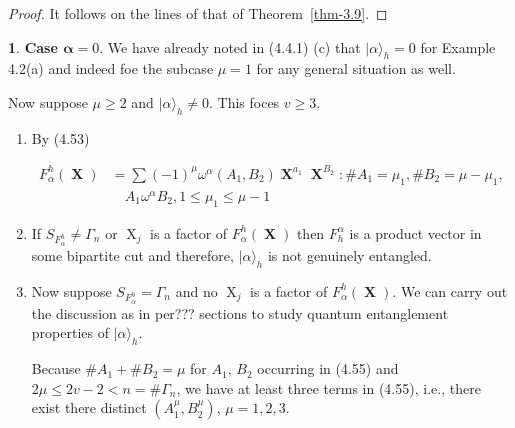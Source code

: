 \documentclass[a4paper,12pt]{article}
\DeclareMathOperator{\x}{\mathrm{X}}
\theoremstyle{definition}
\theoremstyle{underlinethm}
\theoremstyle{definition}
\newtheorem{subsubsec}{}[subsection]
\begin{document}
\begin{proof}
It follows on the lines of that of Theorem~\ref{thm-3.9}.
\end{proof}

\begin{subsubsec}\label{subsubsection-4.4.2}
\textbf{Case $\boldsymbol{\alpha} =0$}. We have already noted in (4.4.1) (c) that $| \alpha \rangle_{h} = 0$ for Example 4.2(a) and indeed foe the subcase $\mu=1$ for any general situation as well.

Now suppose $\mu \geq 2$ and $| \alpha \rangle_{h} \neq 0$. This foces $v \geq 3$.

\end{subsubsec}

\begin{enumerate}[label=(\alph*)]

\item By (4.53)

\begin{align*}
F_{\alpha}^{h}(\boldsymbol{\x}) &= \sum (-1)^{\mu} \omega^{\alpha}(A_{1}, B_{2}) \boldsymbol{\x}^{a_{1}} \boldsymbol{\x}^{B_{2}} : \# A_{1} = \mu_{1}, \# B_{2} = \mu-\mu_{1},\\
&\quad A_{1}\omega^{\alpha} B_{2}, 1 \leq \mu_{1} \leq \mu-1\tag{4.55}\label{eq-4.55} 
\end{align*}

\item If $S_{F^{h}_{\alpha}} \neq \Gamma_{n}$ or $\x_{j}$ is a factor of $F_{\alpha}^{h}(\boldsymbol{\x})$ then $F_{h}^{\alpha}$ is a product vector in some bipartite cut and therefore, $| \alpha \rangle_{h}$ is not genuinely entangled. 

\item Now suppose $S_{F_{\alpha}^{h}}= \Gamma_{n}$ and no $\x_{j}$ is a factor of $F_{\alpha}^{h}(\boldsymbol{\x})$. We can carry out the discussion as in per??? sections to study quantum entanglement properties of $| \alpha \rangle_{h}$.

Because $\# A_{1} + \# B_{2} = \mu$ for $A_{1}$, $B_{2}$ occurring in (4.55) and $2\mu \leq 2v-2 < n = \# \Gamma_{n}$, we have at least three terms in (4.55), i.e., there exist there distinct $(A_{1}^{\mu}, B_{2}^{\mu})$, $\mu= 1,2,3$.
\end{enumerate}
\end{document}
